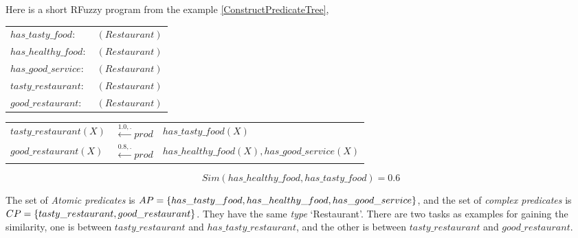 \begin{ex}

Here is a short RFuzzy program from the example \ref{ConstructPredicateTree},
\begin{center}
\begin{tabular}{l l}
$has\_tasty\_food:$  & $(Restaurant)$\\

$has\_healthy\_food:$ &  $(Restaurant)$\\

$has\_good\_service:$  & $(Restaurant)$\\

$tasty\_restaurant:$  & $(Restaurant)$\\

$good\_restaurant:$  & $(Restaurant)$\\
\end{tabular}
\end{center}
\begin{tabular}{l l l}
$tasty\_restaurant(X)$ & $\stackrel{1.0,.}{\longleftarrow} prod$ & $has\_tasty\_food(X)$\\

$good\_restaurant(X)$ & $\stackrel{0.8,.}{\longleftarrow} prod$ & $has\_healthy\_food(X), has\_good\_service(X)$ \\

\end{tabular}
\[Sim(has\_healthy\_food, has\_tasty\_food) = 0.6\]

\end{ex}
The set of \textit{Atomic predicates} is $AP= \{has\_tasty\_food, has\_healthy\_food, \linebreak[4]has\_good\_service\}$, and the set of \textit{complex predicates} is $CP= \{tasty\_restaurant,  \linebreak[4]good\_restaurant\}$. They have the same \textit{type} `Restaurant'. There are two tasks as examples for gaining the similarity, one is between  $tasty\_restaurant$ and $has\_tasty\_restaurant$, and the other is between $tasty\_restaurant$ and  \linebreak[4]$good\_restaurant$.


